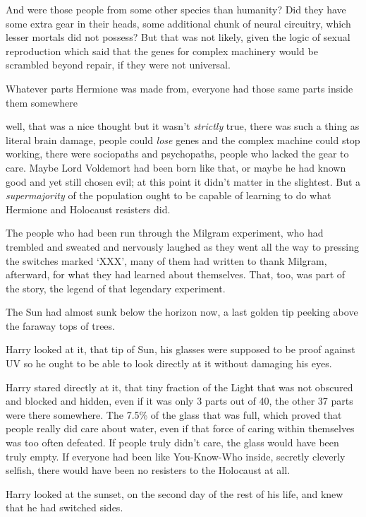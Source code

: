 And were those people from some other species than humanity? Did they have some
extra gear in their heads, some additional chunk of neural circuitry, which
lesser mortals did not possess? But that was not likely, given the logic of
sexual reproduction which said that the genes for complex machinery would be
scrambled beyond repair, if they were not universal.

Whatever parts Hermione was made from, everyone had those same parts inside
them somewhere{\el}

{\el} well, that was a nice thought but it wasn't \emph{strictly} true, there
was such a thing as literal brain damage, people could \emph{lose} genes and
the complex machine could stop working, there were sociopaths and psychopaths,
people who lacked the gear to care. Maybe Lord Voldemort had been born like
that, or maybe he had known good and yet still chosen evil; at this point it
didn't matter in the slightest. But a \emph{supermajority} of the population
ought to be capable of learning to do what Hermione and Holocaust resisters did.

The people who had been run through the Milgram experiment, who had trembled
and sweated and nervously laughed as they went all the way to pressing the
switches marked `XXX', many of them had written to thank Milgram, afterward,
for what they had learned about themselves. That, too, was part of the story,
the legend of that legendary experiment.

The Sun had almost sunk below the horizon now, a last golden tip peeking above
the faraway tops of trees.

Harry looked at it, that tip of Sun, his glasses were supposed to be proof
against UV so he ought to be able to look directly at it without damaging his
eyes.

Harry stared directly at it, that tiny fraction of the Light that was not
obscured and blocked and hidden, even if it was only 3 parts out of 40, the
other 37 parts were there somewhere. The 7.5\% of the glass that was full, which
proved that people really did care about water, even if that force of caring
within themselves was too often defeated. If people truly didn't care, the
glass would have been truly empty. If everyone had been like You-Know-Who
inside, secretly cleverly selfish, there would have been no resisters to the
Holocaust at all.

Harry looked at the sunset, on the second day of the rest of his life, and knew
that he had switched sides.

